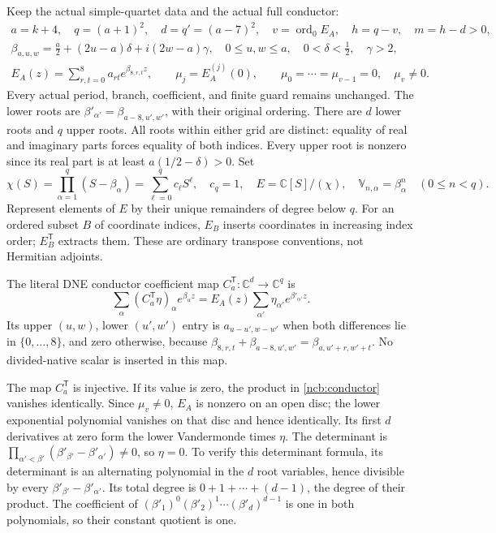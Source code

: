 \documentclass[11pt,a4paper]{article}
\begin{document}
Keep the actual simple-quartet data and the actual full conductor:
\begin{equation}\tag{NCB1}\label{ncb:data}
\begin{gathered}
a=k+4,\quad q=(a+1)^2,\quad d=q'=(a-7)^2,\quad
v=\operatorname{ord}_0E_A,\quad h=q-v,\quad m=h-d>0,\\
\beta_{a,u,w}=\frac a2+(2u-a)\delta+i(2w-a)\gamma,
\quad 0\leq u,w\leq a,\quad 0<\delta<\tfrac12,\quad\gamma>2,\\
E_A(z)=\sum_{r,t=0}^{8}a_{rt}e^{\beta_{8,r,t}z},
\qquad \mu_j=E_A^{(j)}(0),\qquad
\mu_0=\cdots=\mu_{v-1}=0,\quad\mu_v\ne0 .
\end{gathered}
\end{equation}
Every actual period, branch, coefficient, and finite guard remains
unchanged. The lower roots are
$\beta'_{\alpha'}=\beta_{a-8,u',w'}$, with their original ordering.
There are $d$ lower roots and $q$ upper roots. All roots within either
grid are distinct: equality of real and imaginary parts forces equality
of both indices. Every upper root is nonzero since its real part is
at least $a(1/2-\delta)>0$. Set
\begin{equation}\tag{NCB2}\label{ncb:chi}
\chi(S)=\prod_{\alpha=1}^{q}(S-\beta_\alpha)
       =\sum_{\ell=0}^{q}c_\ell S^\ell,\quad c_q=1,\quad
E=\mathbb C[S]/(\chi),\quad
\mathbb V_{n,\alpha}=\beta_\alpha^n\quad(0\leq n<q).
\end{equation}
Represent elements of $E$ by their unique remainders of degree below
$q$. For an ordered subset $B$ of coordinate indices, $E_B$ inserts
coordinates in increasing index order; $E_B^{\mathsf T}$ extracts them.
These are ordinary transpose conventions, not Hermitian adjoints.

The literal DNE conductor coefficient map
$C_a^{\mathsf T}:\mathbb C^d\to\mathbb C^q$ is
\begin{equation}\tag{NCB3}\label{ncb:conductor}
\sum_\alpha(C_a^{\mathsf T}\eta)_\alpha e^{\beta_\alpha z}
=E_A(z)\sum_{\alpha'}\eta_{\alpha'}e^{\beta'_{\alpha'}z}.
\end{equation}
Its upper $(u,w)$, lower $(u',w')$ entry is
$a_{u-u',w-w'}$ when both differences lie in $\{0,\ldots,8\}$, and
zero otherwise, because
$\beta_{8,r,t}+\beta_{a-8,u',w'}=\beta_{a,u'+r,w'+t}$.
No divided-native scalar is inserted in this map.

The map $C_a^{\mathsf T}$ is injective. If its value is zero, the
product in \eqref{ncb:conductor} vanishes identically. Since
$\mu_v\ne0$, $E_A$ is nonzero on an open disc; the lower exponential
polynomial vanishes on that disc and hence identically. Its first $d$
derivatives at zero form the lower Vandermonde times $\eta$. The
determinant is
$\prod_{\alpha'<\beta'}(\beta'_{\beta'}-\beta'_{\alpha'})\ne0$,
so $\eta=0$.
To verify this determinant formula, its determinant is an alternating
polynomial in the $d$ root variables, hence divisible by every
$\beta'_{\beta'}-\beta'_{\alpha'}$. Its total degree is
$0+1+\cdots+(d-1)$, the degree of their product. The coefficient of
$(\beta'_1)^0(\beta'_2)^1\cdots(\beta'_d)^{d-1}$ is one in both
polynomials, so their constant quotient is one.
\end{document}
